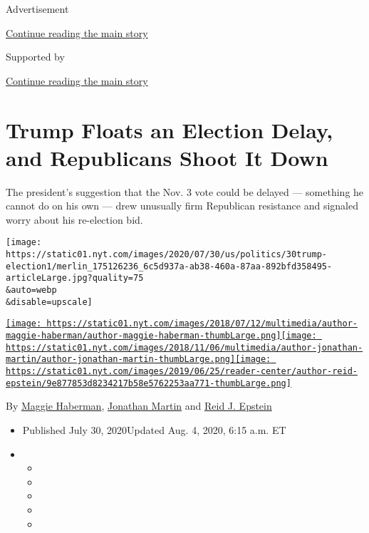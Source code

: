Advertisement

\protect\hyperlink{after-top}{Continue reading the main story}

Supported by

\protect\hyperlink{after-sponsor}{Continue reading the main story}

\hypertarget{trump-floats-an-election-delay-and-republicans-shoot-it-down}{%
\section{Trump Floats an Election Delay, and Republicans Shoot It
Down}\label{trump-floats-an-election-delay-and-republicans-shoot-it-down}}

The president's suggestion that the Nov. 3 vote could be delayed ---
something he cannot do on his own --- drew unusually firm Republican
resistance and signaled worry about his re-election bid.

\texttt{[image: https://static01.nyt.com/images/2020/07/30/us/politics/30trump-election1/merlin\_175126236\_6c5d937a-ab38-460a-87aa-892bfd358495-articleLarge.jpg?quality=75\\\&auto=webp\\\&disable=upscale]}

\href{https://www.nytimes.com/by/maggie-haberman}{\texttt{[image: https://static01.nyt.com/images/2018/07/12/multimedia/author-maggie-haberman/author-maggie-haberman-thumbLarge.png]}}\href{https://www.nytimes.com/by/jonathan-martin}{\texttt{[image: https://static01.nyt.com/images/2018/11/06/multimedia/author-jonathan-martin/author-jonathan-martin-thumbLarge.png]}}\href{https://www.nytimes.com/by/reid-j-epstein}{\texttt{[image: https://static01.nyt.com/images/2019/06/25/reader-center/author-reid-epstein/9e877853d8234217b58e5762253aa771-thumbLarge.png]}}

By \href{https://www.nytimes.com/by/maggie-haberman}{Maggie Haberman},
\href{https://www.nytimes.com/by/jonathan-martin}{Jonathan Martin} and
\href{https://www.nytimes.com/by/reid-j-epstein}{Reid J. Epstein}

\begin{itemize}
\item
  Published July 30, 2020Updated Aug. 4, 2020, 6:15 a.m. ET
\item
  \begin{itemize}
  \item
  \item
  \item
  \item
  \item
  \end{itemize}
\end{itemize}

